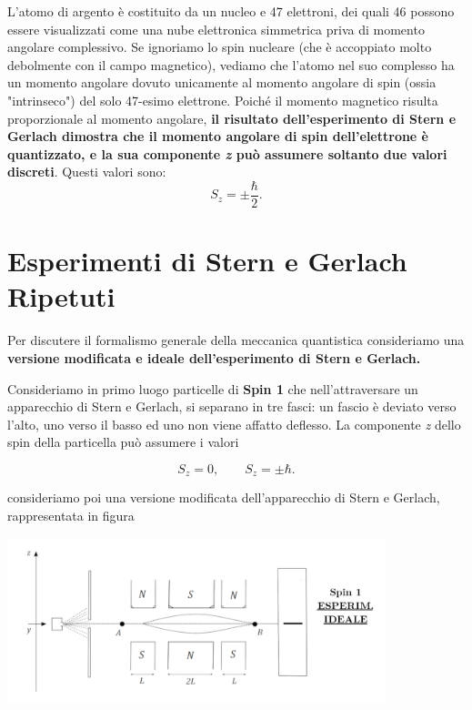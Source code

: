 \documentclass[a4paper,12pt,oneside]{book}
\begin{document}
L'atomo di argento è costituito da un nucleo e 47 elettroni, dei quali 46 possono essere visualizzati come una nube elettronica simmetrica priva di momento angolare complessivo. Se ignoriamo lo spin nucleare (che è accoppiato molto debolmente con il campo magnetico), vediamo che l'atomo nel suo complesso ha un momento angolare dovuto unicamente al momento angolare di spin (ossia "intrinseco") del solo 47-esimo elettrone. Poiché il momento magnetico risulta proporzionale al momento angolare, \textbf{il risultato dell'esperimento di Stern e Gerlach dimostra che il momento angolare di spin dell'elettrone è quantizzato, e la sua componente \emph{z} può assumere soltanto due valori discreti}. Questi valori sono:
\begin{equation}
S_z= \pm \frac{\hbar}{2}.
\end{equation}
 
\section{Esperimenti di Stern e Gerlach Ripetuti} 
Per discutere il formalismo generale della meccanica quantistica consideriamo una \textbf{versione modificata e ideale dell'esperimento di Stern e Gerlach.}
 
Consideriamo in primo luogo particelle di \textbf{Spin 1} che nell'attraversare un apparecchio di Stern e Gerlach, si separano in tre fasci: un fascio è deviato verso l'alto, uno verso il basso ed uno non viene affatto deflesso. La componente \emph{z} dello spin della particella può assumere i valori

\begin{equation}
S_z=0, \qquad S_z= \pm \hbar .
\end{equation}

consideriamo poi una versione modificata dell'apparecchio di Stern e Gerlach, rappresentata in figura \\
\begin{center}
\includegraphics[width=11cm]{immagini/cap_3/fig_3_3.png}
\end{center}
\end{document}
